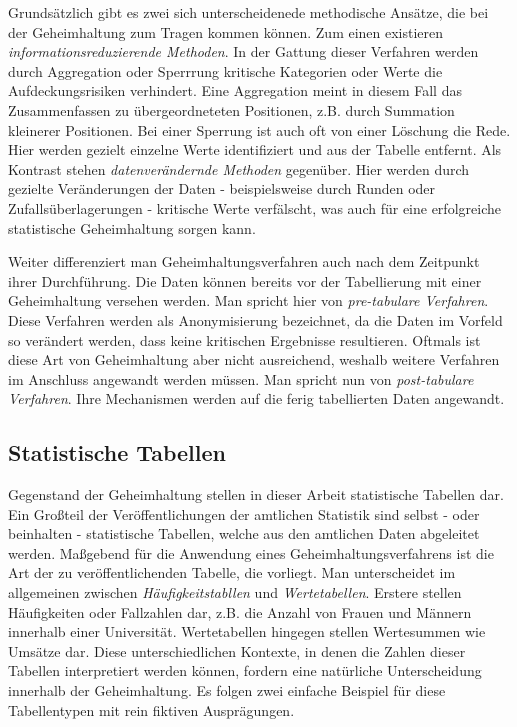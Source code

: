 Grundsätzlich gibt es zwei sich unterscheidenede methodische Ansätze, die bei der Geheimhaltung zum Tragen kommen können. Zum einen existieren \textit{informationsreduzierende Methoden}. In der Gattung dieser Verfahren werden durch Aggregation oder Sperrrung kritische Kategorien oder Werte die Aufdeckungsrisiken verhindert. Eine Aggregation meint in diesem Fall das Zusammenfassen zu übergeordneteten Positionen, z.B. durch Summation kleinerer Positionen. Bei einer Sperrung ist auch oft von einer Löschung die Rede. Hier werden gezielt einzelne Werte identifiziert und aus der Tabelle entfernt. Als Kontrast stehen \textit{datenverändernde Methoden} gegenüber. Hier werden durch gezielte Veränderungen der Daten - beispielsweise durch Runden oder Zufallsüberlagerungen - kritische Werte verfälscht, was auch für eine erfolgreiche statistische Geheimhaltung sorgen kann. 

Weiter differenziert man Geheimhaltungsverfahren auch nach dem Zeitpunkt ihrer Durchführung. Die Daten können bereits vor der Tabellierung mit einer Geheimhaltung versehen werden. Man spricht hier von \textit{pre-tabulare Verfahren}. Diese Verfahren werden als Anonymisierung bezeichnet, da die Daten im Vorfeld so verändert werden, dass keine kritischen Ergebnisse resultieren. Oftmals ist diese Art von Geheimhaltung aber nicht ausreichend, weshalb weitere Verfahren im Anschluss angewandt werden müssen. Man spricht nun von \textit{post-tabulare Verfahren}. Ihre Mechanismen werden auf die ferig tabellierten Daten angewandt.


\subsection{Statistische Tabellen}

Gegenstand der Geheimhaltung stellen in dieser Arbeit statistische Tabellen dar. Ein Großteil der Veröffentlichungen der amtlichen Statistik sind selbst - oder beinhalten - statistische Tabellen, welche aus den amtlichen Daten abgeleitet werden. Maßgebend für die Anwendung eines Geheimhaltungsverfahrens ist die Art der zu veröffentlichenden Tabelle, die vorliegt. Man unterscheidet im allgemeinen zwischen \textit{Häufigkeitstabllen} und \textit{Wertetabellen}. Erstere stellen Häufigkeiten oder Fallzahlen dar, z.B. die Anzahl von Frauen und Männern innerhalb einer Universität. Wertetabellen hingegen stellen Wertesummen wie Umsätze dar. Diese unterschiedlichen Kontexte, in denen die Zahlen dieser Tabellen interpretiert werden können, fordern eine natürliche Unterscheidung innerhalb der Geheimhaltung. Es folgen zwei einfache Beispiel für diese Tabellentypen mit rein fiktiven Ausprägungen.

